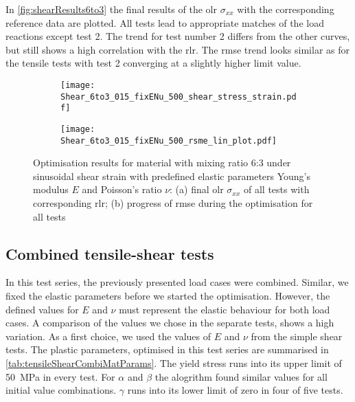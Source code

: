 In \autoref{fig:shearResults6to3} the final results of the \acrlong{olr} $\sigma_{xx}$ with the corresponding reference data are plotted.
All tests lead to appropriate matches of the load reactions except test 2.
The trend for test number 2 differs from the other curves, but still shows a high correlation with the \acrlong{rlr}.
The \acrshort{rmse} trend looks similar as for the tensile tests with test 2 converging at a slightly higher limit value. 


\begin{figure}[H]
\centering
\begin{subfigure}[t]{0.495\textwidth}
    \centering
     \texttt{[image: Shear\_6to3\_015\_fixENu\_500\_shear\_stress\_strain.pdf]}
        \caption{}
        \label{subfig:shearStressStrain6to3}
\end{subfigure}
\hfill
\begin{subfigure}[t]{0.495\textwidth}
    \centering
    \texttt{[image: Shear\_6to3\_015\_fixENu\_500\_rsme\_lin\_plot.pdf]}
        \caption{}
        \label{subfig:shearRMSE}
\end{subfigure}
\caption{Optimisation results for material with mixing ratio 6:3 under sinusoidal shear strain with predefined elastic parameters Young's modulus $E$ and Poisson's ratio $\nu$: (a) final \acrlong{olr} $\sigma_{xx}$ of all tests with corresponding \acrfull{rlr}; (b) progress of \acrfull{rmse} during the optimisation for all tests}
\label{fig:shearResults6to3}
\end{figure}

\subsection{Combined tensile-shear tests}\label{subsec:tensileShearCombi}

In this test series, the previously presented load cases were combined. Similar, we fixed the elastic parameters before we started the optimisation. However, the defined values for $E$ and $\nu$ must represent the elastic behaviour for both load cases. A comparison of the values we chose in the separate tests, shows a high variation. 
As a first choice, we used the values of $E$ and $\nu$ from the simple shear tests. The plastic parameters, optimised in this test series are summarised in \autoref{tab:tensileShearCombiMatParams}. The yield stress runs into its upper limit of 50 MPa in every test. For $\alpha$ and $\beta$ the alogrithm found similar values for all initial value combinations. $\gamma$ runs into its lower limit of zero in four of five tests. 


